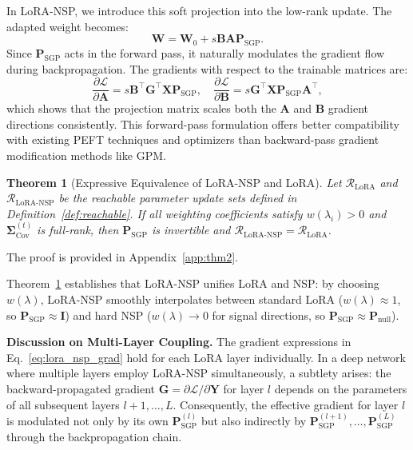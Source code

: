 \documentclass{article}
\newtheorem{theorem}{Theorem}[section]
\begin{document}
In LoRA-NSP, we introduce this soft projection into the low-rank update. The adapted weight becomes:
\begin{equation}
    \mathbf{W} = \mathbf{W}_0 + s\mathbf{B}\mathbf{A}\mathbf{P}_{\text{SGP}}.
    \label{eq:lora_nsp_fwd}
\end{equation}
Since $\mathbf{P}_{\text{SGP}}$ acts in the forward pass, it naturally modulates the gradient flow during backpropagation. The gradients with respect to the trainable matrices are:
\begin{equation}
    \frac{\partial \mathcal{L}}{\partial \mathbf{A}} = s\mathbf{B}^\top \mathbf{G}^\top \mathbf{X} \mathbf{P}_{\text{SGP}}, \quad \frac{\partial \mathcal{L}}{\partial \mathbf{B}} = s\mathbf{G}^\top \mathbf{X} \mathbf{P}_{\text{SGP}} \mathbf{A}^\top,
    \label{eq:lora_nsp_grad}
\end{equation}
which shows that the projection matrix scales both the $\mathbf{A}$ and $\mathbf{B}$ gradient directions consistently. This forward-pass formulation offers better compatibility with existing PEFT techniques and optimizers than backward-pass gradient modification methods like GPM.

\begin{theorem}[Expressive Equivalence of LoRA-NSP and LoRA]
\label{thm:expressive}
Let $\mathcal{R}_{\text{LoRA}}$ and $\mathcal{R}_{\text{LoRA-NSP}}$ be the reachable parameter update sets defined in Definition~\ref{def:reachable}. If all weighting coefficients satisfy $w(\lambda_i) > 0$ and $\mathbf{\Sigma}_{\text{Cov}}^{(t)}$ is full-rank, then $\mathbf{P}_{\text{SGP}}$ is invertible and $\mathcal{R}_{\text{LoRA-NSP}} = \mathcal{R}_{\text{LoRA}}$.
\end{theorem}

The proof is provided in Appendix~\ref{app:thm2}.

Theorem~\ref{thm:expressive} establishes that LoRA-NSP unifies LoRA and NSP: by choosing $w(\lambda)$, LoRA-NSP smoothly interpolates between standard LoRA ($w(\lambda) \approx 1$, so $\mathbf{P}_{\text{SGP}} \approx \mathbf{I}$) and hard NSP ($w(\lambda) \to 0$ for signal directions, so $\mathbf{P}_{\text{SGP}} \approx \mathbf{P}_{\text{null}}$).

\textbf{Discussion on Multi-Layer Coupling.}
The gradient expressions in Eq.~\eqref{eq:lora_nsp_grad} hold for each LoRA layer individually. In a deep network where multiple layers employ LoRA-NSP simultaneously, a subtlety arises: the backward-propagated gradient $\mathbf{G} = \partial \mathcal{L} / \partial \mathbf{Y}$ for layer $l$ depends on the parameters of all subsequent layers $l+1, \ldots, L$. Consequently, the effective gradient for layer $l$ is modulated not only by its own $\mathbf{P}_{\text{SGP}}^{(l)}$ but also indirectly by $\mathbf{P}_{\text{SGP}}^{(l+1)}, \ldots, \mathbf{P}_{\text{SGP}}^{(L)}$ through the backpropagation chain.
\end{document}
